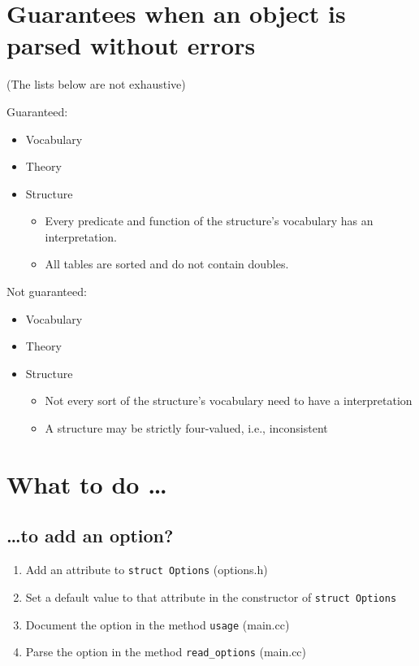 \documentclass{article}
\begin{document}
\section{Guarantees when an object is parsed without errors}

(The lists below are not exhaustive)

Guaranteed:
\begin{itemize}
	\item Vocabulary
	\item Theory
	\item Structure
	\begin{itemize}
		\item Every predicate and function of the structure's vocabulary has an interpretation.
		\item All tables are sorted and do not contain doubles.
	\end{itemize}
\end{itemize}

Not guaranteed:
\begin{itemize}
	\item Vocabulary
	\item Theory
	\item Structure
	\begin{itemize}
		\item Not every sort of the structure's vocabulary need to have a interpretation
		\item A structure may be strictly four-valued, i.e., inconsistent
	\end{itemize}
\end{itemize}

\section{What to do \ldots}\label{sec:whattodo}

\subsection*{\ldots to add an option?}
\begin{enumerate}
	\item Add an attribute to \texttt{struct Options} (options.h)
	\item Set a default value to that attribute in the constructor of \texttt{struct Options}
	\item Document the option in the method \texttt{usage} (main.cc)
	\item Parse the option in the method \texttt{read\_options} (main.cc)
\end{enumerate}
\end{document}

